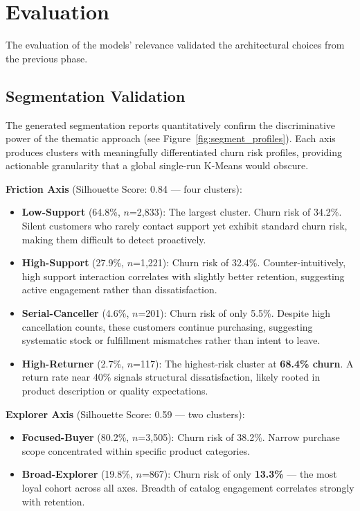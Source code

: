 \documentclass[11pt,a4paper]{article}
\begin{document}
\section{Evaluation}

The evaluation of the models' relevance validated the architectural choices from the previous phase.

\subsection{Segmentation Validation}
The generated segmentation reports quantitatively confirm the discriminative power of the thematic approach (see Figure~\ref{fig:segment_profiles}). Each axis produces clusters with meaningfully differentiated churn risk profiles, providing actionable granularity that a global single-run K-Means would obscure.

\textbf{Friction Axis} (Silhouette Score: 0.84 --- four clusters):
\begin{itemize}
    \item \textbf{Low-Support} (64.8\%, $n$=2{,}833): The largest cluster. Churn risk of 34.2\%. Silent customers who rarely contact support yet exhibit standard churn risk, making them difficult to detect proactively.
    \item \textbf{High-Support} (27.9\%, $n$=1{,}221): Churn risk of 32.4\%. Counter-intuitively, high support interaction correlates with slightly better retention, suggesting active engagement rather than dissatisfaction.
    \item \textbf{Serial-Canceller} (4.6\%, $n$=201): Churn risk of only 5.5\%. Despite high cancellation counts, these customers continue purchasing, suggesting systematic stock or fulfillment mismatches rather than intent to leave.
    \item \textbf{High-Returner} (2.7\%, $n$=117): The highest-risk cluster at \textbf{68.4\% churn}. A return rate near 40\% signals structural dissatisfaction, likely rooted in product description or quality expectations.
\end{itemize}

\textbf{Explorer Axis} (Silhouette Score: 0.59 --- two clusters):
\begin{itemize}
    \item \textbf{Focused-Buyer} (80.2\%, $n$=3{,}505): Churn risk of 38.2\%. Narrow purchase scope concentrated within specific product categories.
    \item \textbf{Broad-Explorer} (19.8\%, $n$=867): Churn risk of only \textbf{13.3\%} --- the most loyal cohort across all axes. Breadth of catalog engagement correlates strongly with retention.
\end{itemize}
\end{document}
